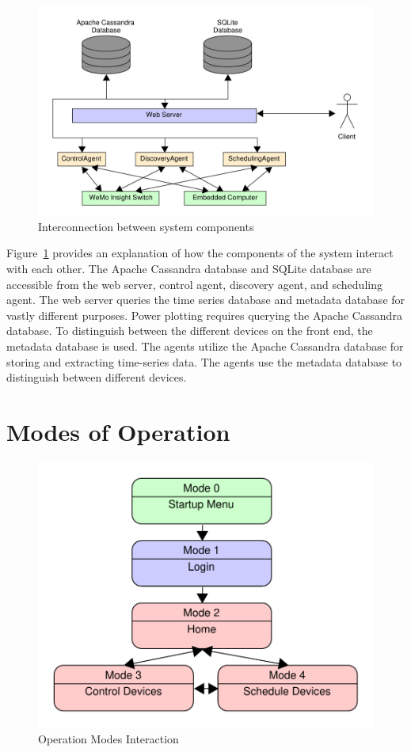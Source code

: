 \begin{figure}[H]
    \centering
    \includegraphics[scale=0.6]{figs/overallDiagram.pdf}
    \caption{Interconnection between system components}
    \label{fig:systemComponentInterconnection}
\end{figure}

Figure~\ref{fig:systemComponentInterconnection} provides an explanation of how the components of the system interact with each other. The Apache Cassandra database and SQLite database are accessible from the web server, control agent, discovery agent, and scheduling agent. The web server queries the time series database and metadata database for vastly different purposes. Power plotting requires querying the Apache Cassandra database. To distinguish between the different devices on the front end, the metadata database is used. The agents utilize the Apache Cassandra database for storing and extracting time-series data. The agents use the metadata database to distinguish between different devices. 

\section{Modes of Operation}

\begin{figure}[H]
    \centering
    \includegraphics[scale=0.9]{figs/operationalModes.pdf}
    \caption{Operation Modes Interaction}
    \label{fig:functional_bd}
\end{figure}

